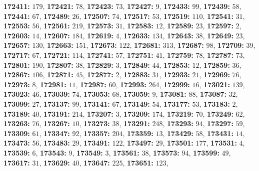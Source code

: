 \textsf{\bfseries 172411:} $179$, \textsf{\bfseries 172421:} $78$, \textsf{\bfseries 172423:} $73$, \textsf{\bfseries 172427:} $9$, \textsf{\bfseries 172433:} $99$, \textsf{\bfseries 172439:} $58$, \textsf{\bfseries 172441:} $67$, \textsf{\bfseries 172489:} $26$, \textsf{\bfseries 172507:} $74$, \textsf{\bfseries 172517:} $53$, \textsf{\bfseries 172519:} $110$, \textsf{\bfseries 172541:} $31$, \textsf{\bfseries 172553:} $56$, \textsf{\bfseries 172561:} $219$, \textsf{\bfseries 172573:} $31$, \textsf{\bfseries 172583:} $12$, \textsf{\bfseries 172589:} $23$, \textsf{\bfseries 172597:} $2$, \textsf{\bfseries 172603:} $14$, \textsf{\bfseries 172607:} $184$, \textsf{\bfseries 172619:} $4$, \textsf{\bfseries 172633:} $134$, \textsf{\bfseries 172643:} $38$, \textsf{\bfseries 172649:} $23$, \textsf{\bfseries 172657:} $130$, \textsf{\bfseries 172663:} $151$, \textsf{\bfseries 172673:} $122$, \textsf{\bfseries 172681:} $313$, \textsf{\bfseries 172687:} $98$, \textsf{\bfseries 172709:} $39$, \textsf{\bfseries 172717:} $67$, \textsf{\bfseries 172721:} $114$, \textsf{\bfseries 172741:} $57$, \textsf{\bfseries 172751:} $41$, \textsf{\bfseries 172759:} $78$, \textsf{\bfseries 172787:} $73$, \textsf{\bfseries 172801:} $190$, \textsf{\bfseries 172807:} $38$, \textsf{\bfseries 172829:} $3$, \textsf{\bfseries 172849:} $44$, \textsf{\bfseries 172853:} $12$, \textsf{\bfseries 172859:} $36$, \textsf{\bfseries 172867:} $106$, \textsf{\bfseries 172871:} $45$, \textsf{\bfseries 172877:} $2$, \textsf{\bfseries 172883:} $31$, \textsf{\bfseries 172933:} $21$, \textsf{\bfseries 172969:} $76$, \textsf{\bfseries 172973:} $8$, \textsf{\bfseries 172981:} $11$, \textsf{\bfseries 172987:} $60$, \textsf{\bfseries 172993:} $264$, \textsf{\bfseries 172999:} $16$, \textsf{\bfseries 173021:} $139$, \textsf{\bfseries 173023:} $46$, \textsf{\bfseries 173039:} $74$, \textsf{\bfseries 173053:} $68$, \textsf{\bfseries 173059:} $9$, \textsf{\bfseries 173081:} $88$, \textsf{\bfseries 173087:} $32$, \textsf{\bfseries 173099:} $27$, \textsf{\bfseries 173137:} $99$, \textsf{\bfseries 173141:} $67$, \textsf{\bfseries 173149:} $54$, \textsf{\bfseries 173177:} $53$, \textsf{\bfseries 173183:} $2$, \textsf{\bfseries 173189:} $40$, \textsf{\bfseries 173191:} $214$, \textsf{\bfseries 173207:} $3$, \textsf{\bfseries 173209:} $174$, \textsf{\bfseries 173219:} $70$, \textsf{\bfseries 173249:} $62$, \textsf{\bfseries 173263:} $76$, \textsf{\bfseries 173267:} $10$, \textsf{\bfseries 173273:} $38$, \textsf{\bfseries 173291:} $248$, \textsf{\bfseries 173293:} $94$, \textsf{\bfseries 173297:} $59$, \textsf{\bfseries 173309:} $61$, \textsf{\bfseries 173347:} $92$, \textsf{\bfseries 173357:} $204$, \textsf{\bfseries 173359:} $13$, \textsf{\bfseries 173429:} $58$, \textsf{\bfseries 173431:} $14$, \textsf{\bfseries 173473:} $56$, \textsf{\bfseries 173483:} $29$, \textsf{\bfseries 173491:} $122$, \textsf{\bfseries 173497:} $29$, \textsf{\bfseries 173501:} $177$, \textsf{\bfseries 173531:} $4$, \textsf{\bfseries 173539:} $6$, \textsf{\bfseries 173543:} $9$, \textsf{\bfseries 173549:} $3$, \textsf{\bfseries 173561:} $38$, \textsf{\bfseries 173573:} $94$, \textsf{\bfseries 173599:} $49$, \textsf{\bfseries 173617:} $31$, \textsf{\bfseries 173629:} $40$, \textsf{\bfseries 173647:} $225$, \textsf{\bfseries 173651:} $123$, 
